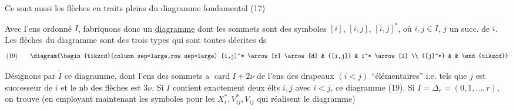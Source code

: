 
Ce sont aussi les  flèches en traits pleins du diagramme fondamental (17)

Avec l'ens ordonné $I$, fabriquons donc un  \uline{diagramme} dont les sommets sont  des symboles  $[i]$, $[i,j]$, $[i,j]^*$, où $i,j\in I$, $j$ un succ. de $i$. Les flèches du diagramme sont des trois types qui sont toutes décrites ds
\[
(19)\qquad
\diagram{\begin{tikzcd}[column sep=large,row sep=large]
[i,j]^* \arrow[r] \arrow[d] & {[i,j]} & i^* \arrow[l] \\
{[j]^*} & &
\end{tikzcd}}
\]

Désignons par $\widetilde I$ ce diagramme, dont l'ens des sommets  a   $\operatorname{card}I+2\nu$   de l'ens des drapeaux $(i<j)$ ``élémentaires'' i.e. tels que $j$ est successeur de $i$ et le nb des flèches est $3\nu$. Si $I$ contient exactement deux élts $i,j$ avec $i<j$,  ce diagramme  (19). Si $I=\Delta_r=(0,1,\ldots,r)$, on trouve (en employant maintenant les symboles pour les $X_i^*,V_{ij}^*,V_{ij}$ qui réalisent le diagramme)

